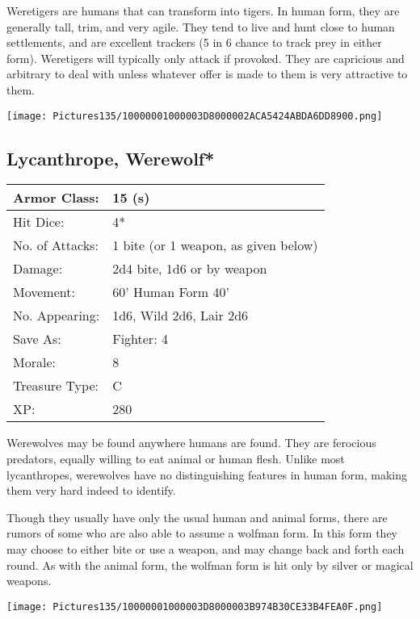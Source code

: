 \documentclass[a4paper,twoside,openany,10pt]{book}
\begin{document}
\begin{multicols}{2}
Weretigers are humans that can transform into tigers. In human form, they are generally tall, trim, and very agile. They tend to live and hunt close to human settlements, and are excellent trackers (5 in 6 chance to track prey in either form). Weretigers will typically only attack if provoked. They are capricious and arbitrary to deal with unless whatever offer is made to them is very attractive to them.

\begin{center} \texttt{[image: Pictures135/10000001000003D8000002ACA5424ABDA6DD8900.png]} \end{center}


\subsection*{Lycanthrope, Werewolf*}\label{lycanthrope-werewolf}

\begin{tabularx}{0.50\textwidth}{@{}lX@{}}
Armor Class: & 15 (s) \\\hline
Hit Dice: & 4* \\\hline
No. of Attacks: & 1 bite (or 1 weapon, as given below) \\\hline
Damage: & 2d4 bite, 1d6 or by weapon \\\hline
Movement: & 60' Human Form 40' \\\hline
No. Appearing: & 1d6, Wild 2d6, Lair 2d6 \\\hline
Save As: & Fighter: 4 \\\hline
Morale: & 8 \\\hline
Treasure Type: & C \\\hline
XP: & 280 \\\hline
\end{tabularx}\medskip

Werewolves may be found anywhere humans are found. They are ferocious predators, equally willing to eat animal or human flesh. Unlike most lycanthropes, werewolves have no distinguishing features in human form, making them very hard indeed to identify.

Though they usually have only the usual human and animal forms, there are rumors of some who are also able to assume a wolfman form. In this form they may choose to either bite or use a weapon, and may change back and forth each round. As with the animal form, the wolfman form is hit only by silver or magical weapons.

\begin{center} \texttt{[image: Pictures135/10000001000003D8000003B974B30CE33B4FEA0F.png]} \end{center}



\end{multicols}
\end{document}
